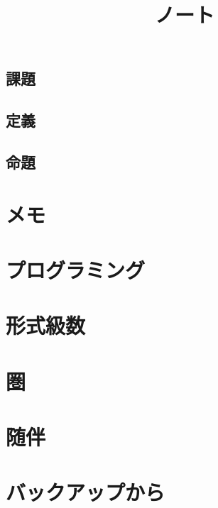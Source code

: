 \documentclass[5pt]{jreport}
\title{ノート}
\author{}
\begin{document}
\maketitle
\tableofcontents
\section*{課題}
\section*{定義}
\section*{命題}

\chapter{メモ}


\chapter{プログラミング}


\chapter{形式級数}

\chapter{圏}

\chapter{随伴}

\chapter{バックアップから}




\end{document}
